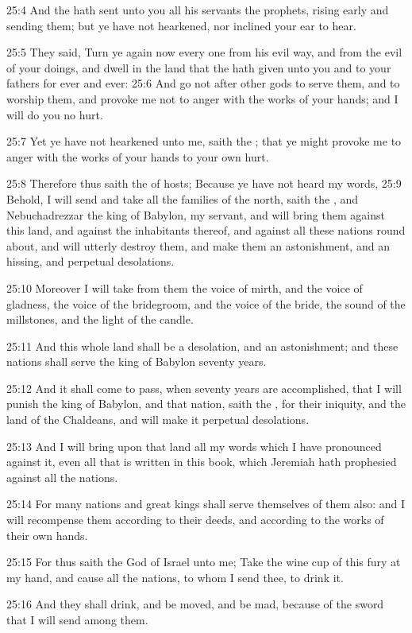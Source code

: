 25:4 And the \LORD hath sent unto you all his servants the prophets,
rising early and sending them; but ye have not hearkened, nor inclined
your ear to hear.

25:5 They said, Turn ye again now every one from his evil way, and
from the evil of your doings, and dwell in the land that the \LORD hath
given unto you and to your fathers for ever and ever: 25:6 And go not
after other gods to serve them, and to worship them, and provoke me
not to anger with the works of your hands; and I will do you no hurt.

25:7 Yet ye have not hearkened unto me, saith the \LORD; that ye might
provoke me to anger with the works of your hands to your own hurt.

25:8 Therefore thus saith the \LORD of hosts; Because ye have not heard
my words, 25:9 Behold, I will send and take all the families of the
north, saith the \LORD, and Nebuchadrezzar the king of Babylon, my
servant, and will bring them against this land, and against the
inhabitants thereof, and against all these nations round about, and
will utterly destroy them, and make them an astonishment, and an
hissing, and perpetual desolations.

25:10 Moreover I will take from them the voice of mirth, and the voice
of gladness, the voice of the bridegroom, and the voice of the bride,
the sound of the millstones, and the light of the candle.

25:11 And this whole land shall be a desolation, and an astonishment;
and these nations shall serve the king of Babylon seventy years.

25:12 And it shall come to pass, when seventy years are accomplished,
that I will punish the king of Babylon, and that nation, saith the
\LORD, for their iniquity, and the land of the Chaldeans, and will make
it perpetual desolations.

25:13 And I will bring upon that land all my words which I have
pronounced against it, even all that is written in this book, which
Jeremiah hath prophesied against all the nations.

25:14 For many nations and great kings shall serve themselves of them
also: and I will recompense them according to their deeds, and
according to the works of their own hands.

25:15 For thus saith the \LORD God of Israel unto me; Take the wine cup
of this fury at my hand, and cause all the nations, to whom I send
thee, to drink it.

25:16 And they shall drink, and be moved, and be mad, because of the
sword that I will send among them.

